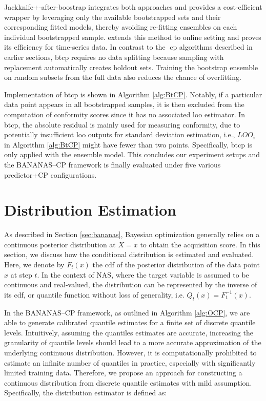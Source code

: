Jackknife+-after-boostrap \cite{kim2020predictive} integrates both approaches and provides a cost-efficient wrapper by leveraging only the available bootstrapped sets and their corresponding fitted models, thereby avoiding re-fitting ensembles on each individual bootstrapped sample. \cite{pmlr-v139-xu21h} extends this method to online setting and proves its efficiency for time-series data. In contrast to the \gls{cp} algorithms described in earlier sections, \gls{btcp} requires no data splitting because sampling with replacement automatically creates holdout sets. Training the bootstrap ensemble on random subsets from the full data also reduces the chance of overfitting.

Implementation of \gls{btcp} is shown in Algorithm \ref{alg:BtCP}. Notably, if a particular  data point appears in all bootstrapped samples, it is then excluded from the computation of conformity scores since it has no associated \gls{loo} estimator. In \gls{btcp}, the absolute residual is mainly used for measuring conformity, due to potentially insufficient \gls{loo} outputs for standard deviation estimation, i.e., $LOO_i$ in Algorithm \ref{alg:BtCP} might have fewer than two points. Specifically, \gls{btcp} is only applied with the ensemble model. This concludes our experiment setups and the BANANAS--CP framework is finally evaluated under five various predictor+CP configurations.


\section{Distribution Estimation}
\label{sec:distest}
As described in Section \ref{sec:bananas}, Bayesian optimization generally relies on a continuous posterior distribution at $X=x$ to obtain the acquisition score. In this section, we discuss how the conditional distribution is estimated and evaluated. Here, we denote by $F_t(x)$ the \gls{cdf} of the posterior distribution of the data point $x$ at step $t$. In the context of NAS, where the target variable is assumed to be continuous and real-valued, the distribution can be represented by the inverse of its \gls{cdf}, or quantile function without loss of generality, i.e. $Q_{t}(x) = F^{-1}_{t}(x)$. 

\vspace{0.3em}
In the BANANAS--CP framework, as outlined in Algorithm \ref{alg:OCP}, we are able to generate calibrated quantile estimates for a finite set of discrete quantile levels. Intuitively, assuming the quantiles estimates are accurate, increasing the granularity of quantile levels should lead to a more accurate approximation of the underlying continuous distribution. However, it is computationally prohibited to estimate an infinite number of quantiles in practice, especially with significantly limited training data. Therefore, we propose an approach for constructing a continuous distribution from discrete quantile estimates with mild assumption. Specifically, the distribution estimator is defined as:

